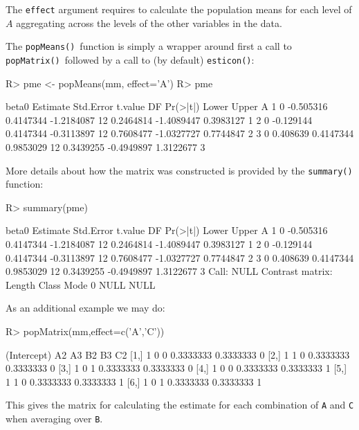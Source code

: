 \documentclass[11pt]{article}
\def\code#1{\texttt{#1}}
\def\popmeans{\code{popMeans()}}
\def\popmatrix{\code{popMatrix()}}
\def\esticon{\code{esticon()}}
\begin{document}
The \verb+effect+ argument requires  to calculate the population means
for each level of
$A$ aggregating across the levels of the other variables in the data.

The \popmeans\ function is simply a wrapper around first a call
to \popmatrix\ followed by a call to (by default) \esticon:
\begin{Schunk}
\begin{Sinput}
R> pme <- popMeans(mm, effect='A')
R> pme
\end{Sinput}
\begin{Soutput}
  beta0  Estimate Std.Error    t.value DF  Pr(>|t|)      Lower     Upper A
1     0 -0.505316 0.4147344 -1.2184087 12 0.2464814 -1.4089447 0.3983127 1
2     0 -0.129144 0.4147344 -0.3113897 12 0.7608477 -1.0327727 0.7744847 2
3     0  0.408639 0.4147344  0.9853029 12 0.3439255 -0.4949897 1.3122677 3
\end{Soutput}
\end{Schunk}

More details about how the matrix was constructed is provided by the
\code{summary()} function:
\begin{Schunk}
\begin{Sinput}
R> summary(pme)
\end{Sinput}
\begin{Soutput}
  beta0  Estimate Std.Error    t.value DF  Pr(>|t|)      Lower     Upper A
1     0 -0.505316 0.4147344 -1.2184087 12 0.2464814 -1.4089447 0.3983127 1
2     0 -0.129144 0.4147344 -0.3113897 12 0.7608477 -1.0327727 0.7744847 2
3     0  0.408639 0.4147344  0.9853029 12 0.3439255 -0.4949897 1.3122677 3
Call:
NULL
Contrast matrix:
Length  Class   Mode 
     0   NULL   NULL 
\end{Soutput}
\end{Schunk}


As an additional example we may do:
\begin{Schunk}
\begin{Sinput}
R> popMatrix(mm,effect=c('A','C'))
\end{Sinput}
\begin{Soutput}
     (Intercept) A2 A3        B2        B3 C2
[1,]           1  0  0 0.3333333 0.3333333  0
[2,]           1  1  0 0.3333333 0.3333333  0
[3,]           1  0  1 0.3333333 0.3333333  0
[4,]           1  0  0 0.3333333 0.3333333  1
[5,]           1  1  0 0.3333333 0.3333333  1
[6,]           1  0  1 0.3333333 0.3333333  1
\end{Soutput}
\end{Schunk}
This gives the matrix for calculating the estimate for each
combination of \code{A} and \code{C} when averaging over \code{B}.
\end{document}
